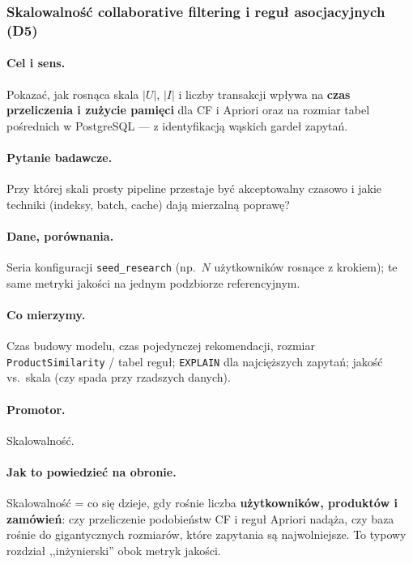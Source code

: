 \documentclass[a4paper,11pt]{article}
\newcommand{\code}[1]{\texttt{\small #1}}
\begin{document}
\subsubsection{Skalowalność collaborative filtering i reguł asocjacyjnych (\textbf{D5})}

\paragraph{Cel i sens.}
Pokazać, jak rosnąca skala $|U|$, $|I|$ i liczby transakcji wpływa na \textbf{czas przeliczenia i zużycie pamięci} dla CF i Apriori oraz na rozmiar tabel pośrednich w PostgreSQL --- z identyfikacją wąskich gardeł zapytań.

\paragraph{Pytanie badawcze.}
Przy której skali prosty pipeline przestaje być akceptowalny czasowo i jakie techniki (indeksy, batch, cache) dają mierzalną poprawę?

\paragraph{Dane, porównania.}
Seria konfiguracji \texttt{seed\_research} (np.\ $N$ użytkowników rosnące z krokiem); te same metryki jakości na jednym podzbiorze referencyjnym.

\paragraph{Co mierzymy.}
Czas budowy modelu, czas pojedynczej rekomendacji, rozmiar \code{ProductSimilarity} / tabel reguł; \texttt{EXPLAIN} dla najcięższych zapytań; jakość vs.\ skala (czy spada przy rzadszych danych).

\paragraph{Promotor.}
Skalowalność.

\paragraph{Jak to powiedzieć na obronie.}
Skalowalność = co się dzieje, gdy rośnie liczba \textbf{użytkowników, produktów i zamówień}: czy przeliczenie podobieństw CF i reguł Apriori nadąża, czy baza rośnie do gigantycznych rozmiarów, które zapytania są najwolniejsze. To typowy rozdział ,,inżynierski'' obok metryk jakości.
\end{document}
